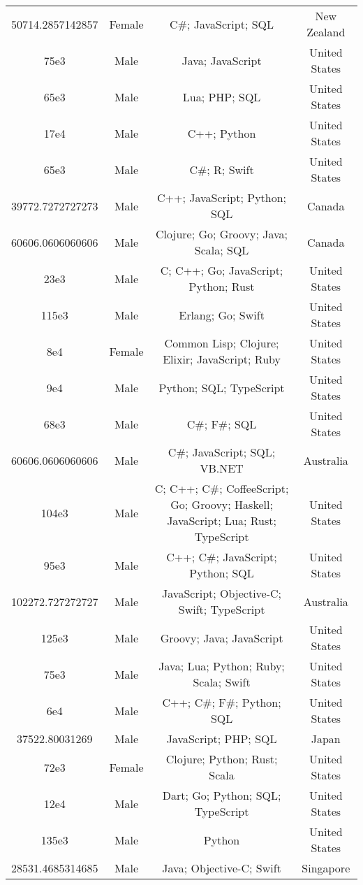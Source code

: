 \begin{center}
\begin{tabular}{ |c|c|c|c| }
50714.2857142857  &  Female  &  C\#; JavaScript; SQL  &  New Zealand  \\ 
75e3  &  Male  &  Java; JavaScript  &  United States  \\ 
65e3  &  Male  &  Lua; PHP; SQL  &  United States  \\ 
17e4  &  Male  &  C++; Python  &  United States  \\ 
65e3  &  Male  &  C\#; R; Swift  &  United States  \\ 
39772.7272727273  &  Male  &  C++; JavaScript; Python; SQL  &  Canada  \\ 
60606.0606060606  &  Male  &  Clojure; Go; Groovy; Java; Scala; SQL  &  Canada  \\ 
23e3  &  Male  &  C; C++; Go; JavaScript; Python; Rust  &  United States  \\ 
115e3  &  Male  &  Erlang; Go; Swift  &  United States  \\ 
8e4  &  Female  &  Common Lisp; Clojure; Elixir; JavaScript; Ruby  &  United States  \\ 
9e4  &  Male  &  Python; SQL; TypeScript  &  United States  \\ 
68e3  &  Male  &  C\#; F\#; SQL  &  United States  \\ 
60606.0606060606  &  Male  &  C\#; JavaScript; SQL; VB.NET  &  Australia  \\ 
104e3  &  Male  &  C; C++; C\#; CoffeeScript; Go; Groovy; Haskell; JavaScript; Lua; Rust; TypeScript  &  United States  \\ 
95e3  &  Male  &  C++; C\#; JavaScript; Python; SQL  &  United States  \\ 
102272.727272727  &  Male  &  JavaScript; Objective-C; Swift; TypeScript  &  Australia  \\ 
125e3  &  Male  &  Groovy; Java; JavaScript  &  United States  \\ 
75e3  &  Male  &  Java; Lua; Python; Ruby; Scala; Swift  &  United States  \\ 
6e4  &  Male  &  C++; C\#; F\#; Python; SQL  &  United States  \\ 
37522.80031269  &  Male  &  JavaScript; PHP; SQL  &  Japan  \\ 
72e3  &  Female  &  Clojure; Python; Rust; Scala  &  United States  \\ 
12e4  &  Male  &  Dart; Go; Python; SQL; TypeScript  &  United States  \\ 
135e3  &  Male  &  Python  &  United States  \\ 
28531.4685314685  &  Male  &  Java; Objective-C; Swift  &  Singapore  \\ 

\end{tabular}
\end{center}
